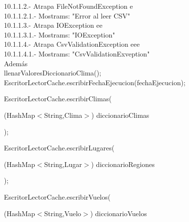 \documentclass[30pt]{article}
\theoremstyle{definition}
\begin{document}
  \hspace{4cm} 10.1.1.2.- Atrapa FileNotFoundException e\\
  
  \hspace{5cm} 10.1.1.2.1.- Mostrams: "Error al leer CSV"\\
  
  \hspace{4cm} 10.1.1.3.- Atrapa IOException ee\\
  
  \hspace{5cm} 10.1.1.3.1.- Mostrams: "IOException"\\
  
  \hspace{4cm} 10.1.1.4.- Atrapa CsvValidationException eee\\
  
  \hspace{5cm} 10.1.1.4.1.- Mostrams: "CsvValidationExveption"\\
  
  \hspace{4cm} Además\\
  
  \hspace{4cm} llenarValoresDiccionarioClima();\\
  
  \hspace{4cm} EscritorLectorCache.escribirFechaEjecucion(fechaEjecucion);
  
    \hspace{4cm} EscritorLectorCache.escribirClimas(
    
  \hspace{5cm} (HashMap$<$String,Clima$>$) diccionarioClimas
  
  \hspace{4cm} );
  
  \hspace{4cm} EscritorLectorCache.escribirLugares(
  
  \hspace{5cm} (HashMap$<$String,Lugar$>$) diccionarioRegiones
  
  \hspace{4cm} );
  
  \hspace{4cm} EscritorLectorCache.escribirVuelos(
  
  \hspace{5cm} (HashMap$<$String,Vuelo$>$) diccionarioVuelos
  
\end{document}
